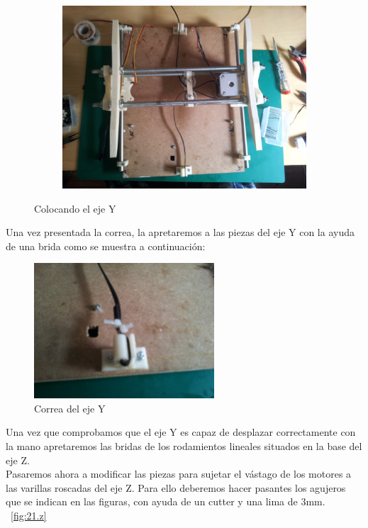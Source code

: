 \begin{figure}[H]
\begin{subfigure}[htb]{0.5\textwidth}
		                \includegraphics[width=\textwidth]{../../Fotos/82.jpg}
		                \label{fig:16.z}
		        \end{subfigure}
		        \caption{Colocando el eje Y}\label{fig:17.z}
		\end{figure}
		Una vez presentada la correa, la apretaremos a las piezas del eje Y con la ayuda de una brida como se muestra a continuación:
		\begin{figure}[!htp]
			\centering
			\includegraphics[width=0.6\textwidth]{../../Fotos/83.jpg}
			\caption{Correa del eje Y}
			\label{fig:18.z}
		\end{figure}
		Una vez que comprobamos que el eje Y es capaz de desplazar correctamente con la mano apretaremos las bridas de los rodamientos lineales situados en la base del eje Z.\\
		Pasaremos ahora a modificar las piezas para sujetar el vástago de los motores a las varillas roscadas del eje Z. Para ello deberemos hacer pasantes los agujeros que se indican en las figuras, con ayuda de un cutter y una lima de 3mm. ~\ref{fig:21.z}

